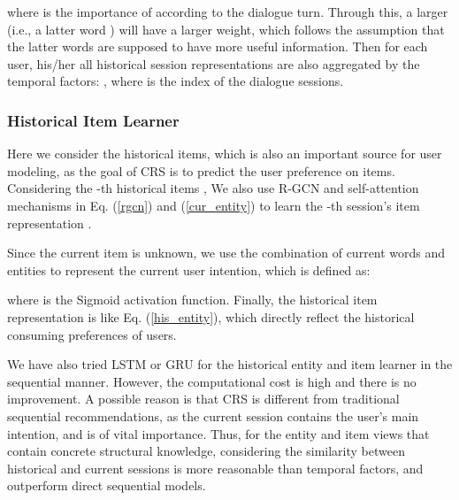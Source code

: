 \documentclass[sigconf,natbib=true]{acmart}
\begin{document}
where  is the importance of  according to the dialogue turn. Through this, a larger  (i.e., a latter word ) will have a larger weight, which follows the assumption that the latter words are supposed to have more useful information. Then for each user, his/her all historical session representations are also aggregated by the temporal factors: , where  is the index of the dialogue sessions.
\begin{comment}

where  is the index of the dialogue sessions. Finally, the historical word representation  reflects user's historical semantic behaviors.
\end{comment}


\subsubsection{Historical Item Learner}

Here we consider the historical items, which is also an important source for user modeling, as the goal of CRS is to predict the user preference on items.
Considering the -th historical items , 
We also use R-GCN and self-attention mechanisms in Eq. (\ref{rgcn}) and (\ref{cur_entity}) to learn the -th session's item representation .
\begin{comment}

\end{comment}
Since the current item is unknown, we use the combination of current words and entities  to represent the current user intention, which is defined as:

where  is the Sigmoid activation function.
Finally, the historical item representation is  like Eq. (\ref{his_entity}), which directly reflect the historical consuming preferences of users.



We have also tried LSTM or GRU for the historical entity and item learner in the sequential manner. However, the computational cost is high and there is no improvement.
A possible reason is that CRS is different from traditional sequential recommendations, as the current session contains the user's main intention, and is of vital importance. Thus, for the entity and item views that contain concrete structural knowledge, considering the similarity between historical and current sessions is more reasonable than temporal factors,
and outperform direct sequential models.
\end{document}
